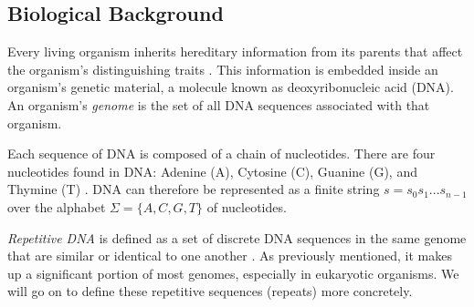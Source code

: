 \subsection{Biological Background}
Every living organism inherits hereditary information from its parents that affect the organism's distinguishing traits \cite{lewin2014lewins}. This information is embedded inside an organism's genetic material, a molecule known as deoxyribonucleic acid (DNA). An organism's \textit{genome} is the set of all DNA sequences associated with that organism.

Each sequence of DNA is composed of a chain of nucleotides. There are four nucleotides found in DNA: Adenine (A), Cytosine (C), Guanine (G), and Thymine (T)  \cite{elloumi2011algorithms}. DNA can therefore be represented as a finite string $s=s_{0}s_{1}...s_{n-1}$ over the alphabet $\Sigma=\lbrace A, C, G, T\rbrace$ of nucleotides.

\textit{Repetitive DNA} is defined as a set of discrete DNA sequences in the same genome that are similar or identical to one another \cite{treangen2012repetitive}. As previously mentioned, it makes up a significant portion of most genomes, especially in eukaryotic organisms. We will go on to define these repetitive sequences (repeats) more concretely. 
  
 


